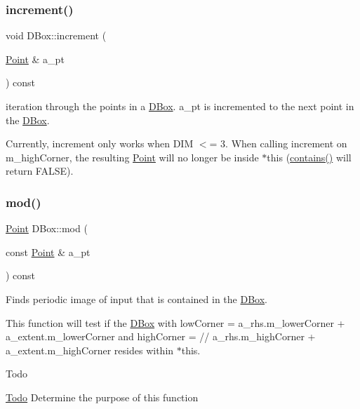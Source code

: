\subsubsection{\texorpdfstring{increment()}{increment()}}
{\footnotesize\ttfamily void D\+Box\+::increment (\begin{DoxyParamCaption}\item[{\hyperlink{class_point}{Point} \&}]{a\+\_\+pt }\end{DoxyParamCaption}) const}



iteration through the points in a \hyperlink{class_d_box}{D\+Box}. a\+\_\+pt is incremented to the next point in the \hyperlink{class_d_box}{D\+Box}. 

Currently, increment only works when D\+IM $<$= 3. When calling increment on m\+\_\+high\+Corner, the resulting \hyperlink{class_point}{Point} will no longer be inside $\ast$this (\hyperlink{class_d_box_aade93ec5c32f93b79f45c11e39d4a546}{contains()} will return F\+A\+L\+SE). \mbox{\label{class_d_box_a60558669bcb1b761aab592c0d70b64ce}} 
\subsubsection{\texorpdfstring{mod()}{mod()}}
{\footnotesize\ttfamily \hyperlink{class_point}{Point} D\+Box\+::mod (\begin{DoxyParamCaption}\item[{const \hyperlink{class_point}{Point} \&}]{a\+\_\+pt }\end{DoxyParamCaption}) const}



Finds periodic image of input that is contained in the \hyperlink{class_d_box}{D\+Box}. 

This function will test if the \hyperlink{class_d_box}{D\+Box} with low\+Corner = a\+\_\+rhs.\+m\+\_\+lower\+Corner + a\+\_\+extent.\+m\+\_\+lower\+Corner and high\+Corner = // a\+\_\+rhs.\+m\+\_\+high\+Corner + a\+\_\+extent.\+m\+\_\+high\+Corner resides within $\ast$this.\begin{DoxyRefDesc}{Todo}
\item[\hyperlink{todo__todo000001}{Todo}]Determine the purpose of this function \end{DoxyRefDesc}
\mbox{\label{class_d_box_a80e097ac4ec5b019d138e07f2d5c22a3}} 
